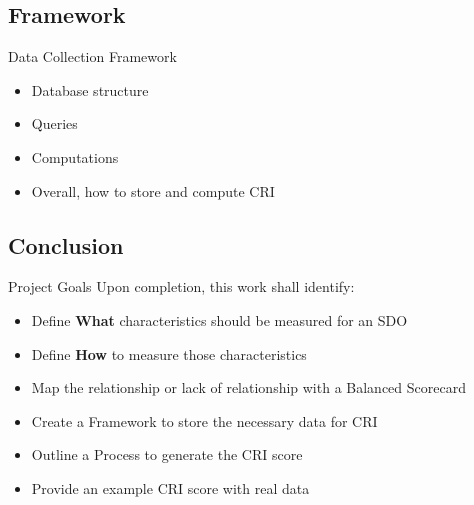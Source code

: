 \subsection{Framework}

\begin{frame}{Data Collection Framework}

    \begin{itemize}
        \item Database structure
        \item Queries
        \item Computations
        \item Overall, how to store and compute CRI
    \end{itemize}
\end{frame}

\subsection{Conclusion}

\begin{frame}{Project Goals}
    Upon completion, this work shall identify:
    \begin{itemize}
        \item Define \textbf{What} characteristics should be measured for an SDO
        \item Define \textbf{How} to measure those characteristics
        \item Map the relationship or lack of relationship with a Balanced Scorecard
        \item Create a Framework to store the necessary data for CRI
        \item Outline a Process to generate the CRI score
        \item Provide an example CRI score with real data
    \end{itemize}
\end{frame}




